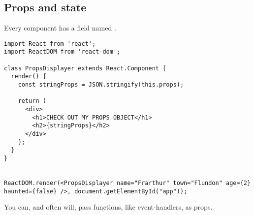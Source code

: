 \subsection{Props and state}
Every component has a field named .
\begin{lstlisting}
import React from 'react';
import ReactDOM from 'react-dom';

class PropsDisplayer extends React.Component {
  render() {
  	const stringProps = JSON.stringify(this.props);

    return (
      <div>
        <h1>CHECK OUT MY PROPS OBJECT</h1>
        <h2>{stringProps}</h2>
      </div>
    );
  }
}


ReactDOM.render(<PropsDisplayer name="Frarthur" town="Flundon" age={2} haunted={false} />, document.getElementById("app"));
\end{lstlisting}

You can, and often will, pass functions, like event-handlers, as props. 
